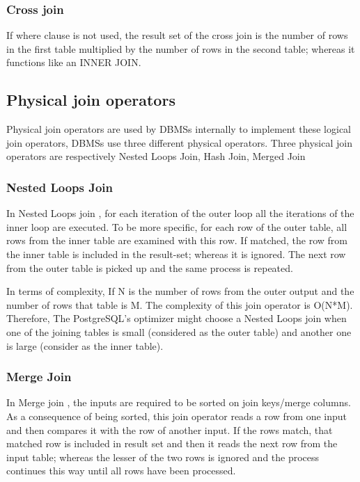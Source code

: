 \subsubsection{Cross join}

If where clause is not used, the result set of the cross join is the number of rows in the first table multiplied by the number of rows in the second table; whereas it functions like an INNER JOIN.

\subsection{Physical join operators}

Physical join operators are used by DBMSs internally to implement these logical join operators, DBMSs use three different physical operators. Three physical join operators are respectively Nested Loops Join, Hash Join, Merged Join

\subsubsection{Nested Loops Join}

In Nested Loops join \cite{physical operators}, for each iteration of the outer loop all the iterations of the inner loop are executed. To be more specific, for each row of the outer table, all rows from the inner table are examined with this row. If matched, the row from the inner table is included in the result-set; whereas it is ignored. The next row from the outer table is picked up and the same process is repeated.

In terms of complexity, If N is the number of rows from the outer output and the number of rows that table is M. The complexity of this join operator is O(N*M). Therefore, The PostgreSQL's optimizer might choose a Nested Loops join when  one of the joining tables is small (considered as the outer table) and another one is large (consider as the inner table).

\subsubsection{Merge Join}

In Merge join \cite{physical operators}, the inputs are required to be sorted on join keys/merge columns. As a consequence of being sorted, this join operator reads a row from one input and then compares it with the row of another input. If the rows match, that matched row is included in result set and then it reads the next row from the input table; whereas the lesser of the two rows is ignored and the process continues this way until all rows have been processed.

